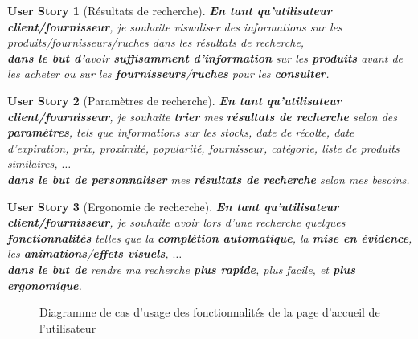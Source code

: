 \documentclass[a4paper,12pt]{report}
\theoremstyle{break}
\newtheorem*{userStory}{User Story}
\theoremstyle{break}
\theoremstyle{break}
\theoremstyle{break}
\theoremstyle{definition}
\theoremstyle{remark}
\begin{document}
\begin{userStory}[Résultats de recherche]
\textbf{En tant qu'utilisateur {\color{green}client}/{\color{red}fournisseur}}, je souhaite visualiser des informations sur les produits/fournisseurs/ruches dans les résultats de recherche,\\
\indent
\textbf{dans le but d'}avoir \textbf{suffisamment d'information} sur les \textbf{produits} avant de les acheter ou sur les \textbf{fournisseurs}/\textbf{ruches} pour les \textbf{consulter}.
\end{userStory}

\begin{userStory}[Paramètres de recherche]
\textbf{En tant qu'utilisateur {\color{green}client}/{\color{red}fournisseur}}, je souhaite \textbf{trier} mes \textbf{résultats de recherche} selon des \textbf{paramètres}, tels que informations sur les stocks, date de récolte, date d'expiration, prix, proximité, popularité, fournisseur, catégorie, liste de produits similaires, $\dots$\\
\indent
\textbf{dans le but de personnaliser} mes \textbf{résultats de recherche} selon mes besoins.
\end{userStory}

\begin{userStory}[Ergonomie de recherche]
\textbf{En tant qu'utilisateur {\color{green}client}/{\color{red}fournisseur}}, je souhaite avoir lors d'une recherche quelques \textbf{fonctionnalités} telles que la \textbf{complétion automatique}, la \textbf{mise en évidence}, les \textbf{animations}/\textbf{effets visuels}, $\dots$\\
\indent
\textbf{dans le but de} rendre ma recherche \textbf{plus rapide}, plus facile, et \textbf{plus ergonomique}.
\end{userStory}

\begin{figure}[!ht]
  \centering
  \caption{Diagramme de cas d'usage des fonctionnalités de la page d'accueil de l'utilisateur}
  \label{fig:home_page_use_case_diagram}
\end{figure}
\end{document}
